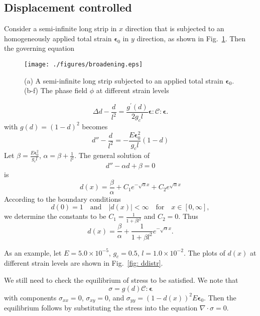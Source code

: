 \documentclass[10pt,onecolumn]{article}
\newcommand{\bs}[1]{\ensuremath{\boldsymbol{#1}}}
\newcommand{\e}{\bs{\epsilon}}
\newcommand{\C}{\mathcal{C}}
\begin{document}
\subsection{Displacement controlled}
Consider a semi-infinite long strip in $x$ direction that is subjected to an homogeneously applied total strain $\e_0$ in $y$ direction, as shown in Fig.~\ref{fig: schematic}. Then the governing equation
%
\begin{figure}
	\centering
	\texttt{[image: ./figures/broadening.eps]}
	\caption{(a) A semi-infinite long strip subjected to an applied total strain $\e_0$. (b-f) The phase field $\phi$ at different strain levels}
	\label{fig: schematic}
\end{figure}
%
\begin{equation}
	\Delta d-\frac{d}{l^2}=\frac{g^\prime(d)}{2g_c l}\e:\C:\e.
\end{equation}
with $g(d) = (1-d)^2$ becomes
\begin{equation}
	d''-\frac{d}{l^2} = -\frac{E\e_0^2}{g_cl}(1-d)
\end{equation}
Let $\beta = \frac{E\e_0^2}{g_cl}$, $\alpha=\beta+\frac{1}{l^2}$. The general solution of 
\begin{equation}
	d''-\alpha d + \beta = 0
\end{equation}
is 
\begin{equation}
	d(x) = \frac{\beta}{\alpha} + C_1 e^{-\sqrt{\alpha}x} + C_2 e^{\sqrt{\alpha}x} 
\end{equation}
According to the boundary conditions
\begin{equation}
	d(0) = 1 \quad \text{and} \quad |d(x)| < \infty \quad \text{for} \quad x\in [0,\infty],
	\label{eq: bcs}
\end{equation}
we determine the constants to be $C_1=\frac{1}{1+\beta l^2}$ and $C_2=0$. Thus
\begin{equation}
	d(x) = \frac{\beta}{\alpha} + \frac{1}{1+\beta l^2} e^{-\sqrt{\alpha}x}.
\end{equation}

As an example, let $E = 5.0\times10^{-5}$, $g_c = 0.5$, $l = 1.0\times10^{-2}$. The plots of $d(x)$ at different strain levels are shown in Fig.~\ref{fig: ddistr}.

We still need to check the equilibrium of stress to be satisfied. We note that 
\begin{equation}
	\sigma = g(d) \C:\e
\end{equation}
with components $\sigma_{xx} = 0$, $\sigma_{xy} = 0$, and $\sigma_{yy} = (1-d(x))^2 E\e_0$. Then the equilibrium follows by substituting the stress into the equation $\nabla\cdot\sigma=0$.
\end{document}
